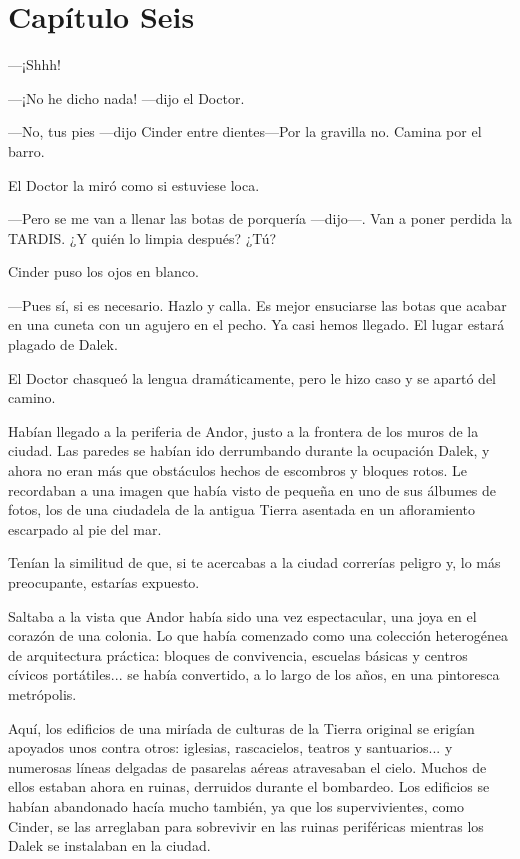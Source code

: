 \chapter*{Capítulo Seis}

—¡Shhh! 

—¡No he dicho nada! —dijo el Doctor.

—No, tus pies —dijo Cinder entre dientes—Por la gravilla no. Camina por el barro.

El Doctor la miró como si estuviese loca.

—Pero se me van a llenar las botas de porquería —dijo—. Van a poner perdida la TARDIS. ¿Y quién lo limpia después? ¿Tú?

Cinder puso los ojos en blanco.

—Pues sí, si es necesario. Hazlo y calla. Es mejor ensuciarse las botas que acabar en una cuneta con un agujero en el pecho. Ya casi hemos llegado. El lugar estará plagado de Dalek.

El Doctor chasqueó la lengua dramáticamente, pero le hizo caso y se apartó del camino.

Habían llegado a la periferia de Andor, justo a la frontera de los muros de la ciudad. Las paredes se habían ido derrumbando durante la ocupación Dalek, y ahora no eran más que obstáculos hechos de escombros y bloques rotos. Le recordaban a una imagen que había visto de pequeña en uno de sus álbumes de fotos, los de una ciudadela de la antigua Tierra asentada en un afloramiento escarpado al pie del mar.

Tenían la similitud de que, si te acercabas a la ciudad correrías peligro y, lo más preocupante, estarías expuesto.

Saltaba a la vista que Andor había sido una vez espectacular, una joya en el corazón de una colonia. Lo que había comenzado como una colección heterogénea de arquitectura práctica: bloques de convivencia, escuelas básicas y centros cívicos portátiles... se había convertido, a lo largo de los años, en una pintoresca metrópolis.

Aquí, los edificios de una miríada de culturas de la Tierra original se erigían apoyados unos contra otros: iglesias, rascacielos, teatros y santuarios... y numerosas líneas delgadas de pasarelas aéreas atravesaban el cielo. Muchos de ellos estaban ahora en ruinas, derruidos durante el bombardeo. Los edificios se habían abandonado hacía mucho también, ya que los supervivientes, como Cinder, se las arreglaban para sobrevivir en las ruinas periféricas mientras los Dalek se instalaban en la ciudad.

